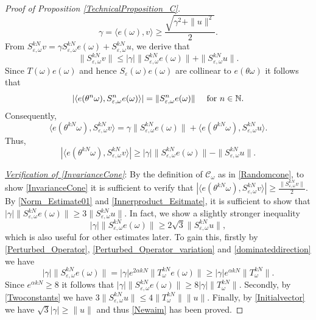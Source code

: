 \documentclass[pdflatex,sn-mathphys-num]{sn-jnl}%
\theoremstyle{thmstyleone}%
\theoremstyle{thmstyletwo}%
\theoremstyle{thmstylethree}%
\newcommand{\N}{\mathbb{N}}
\newcommand{\cC}{\mathcal{C}}
\newcommand{\eps}{\varepsilon}
\numberwithin{equation}{section}
\begin{document}
\begin{proof}[Proof of Proposition \ref{TechnicalProposition_C}]
\begin{equation}\label{Initialvector}
\gamma= \langle e(\omega),v\rangle \geq 
\frac{\sqrt{\gamma^2+\|u\|^2}}{2}.
\end{equation}
From $S_{\eps,\omega}^{kN} v= \gamma S_{\eps,\omega}^{kN} e(\omega)+ S_{\eps,\omega}^{kN} u$, we derive that 
\begin{equation}\label{Norm_Estimate01}
\|S_{\eps,\omega}^{kN} v\|
\leq |\gamma|\|S_{\eps,\omega}^{kN} e(\omega)\|+\|S_{\eps,\omega}^{kN}u\|.
\end{equation}
Since $T(\omega)e(\omega)$ and hence $S_{\eps}(\omega)e(\omega)$ are collinear to $e(\theta\omega)$ it follows that 
\[
|\langle e(\theta^n\omega), S_{\eps,\omega}^n e(\omega)\rangle|=\|S_{\eps,\omega}^ne(\omega)\|
\quad \hbox{ for } n\in\N.
\] 
Consequently,  
\[
\langle e(\theta^{kN}\omega),S_{\eps,\omega}^{kN} v\rangle
=
\gamma \|S_{\eps,\omega}^{kN}e(\omega)\|
+ 
\langle e(\theta^{kN}\omega),S_{\eps,\omega}^{kN} u\rangle.
\]
Thus,
\begin{equation}\label{Innerproduct_Esitmate}
\left|\langle e(\theta^{kN}\omega),S_{\eps,\omega}^{kN} v\rangle \right|
\geq |\gamma| \|S_{\eps,\omega}^{kN}e(\omega)\| -\|S_{\eps,\omega}^{kN} u\|.
\end{equation}

\noindent
\underline{\emph{Verification of \eqref{InvarianceCone}}}: By the  definition of $\cC_{\omega}$ as in \eqref{Randomcone}, to show \eqref{InvarianceCone} it is sufficient to
verify that  $\left|\langle e(\theta^{kN}\omega),S_{\eps,\omega}^{kN} v\rangle \right|\geq \frac{\|S_{\eps,\omega}^{kN} v\|}{2}$. By \eqref{Norm_Estimate01} and \eqref{Innerproduct_Esitmate}, it is sufficient to show that $|\gamma| \|S_{\eps,\omega}^{kN}e(\omega)\|
  \geq 
 3 \|S_{\eps,\omega}^{kN} u\|$. In fact, we show a slightly stronger inequality
\begin{equation}\label{Newaim}
  |\gamma| \|S_{\eps,\omega}^{kN}e(\omega)\|
  \geq 
 2\sqrt{3} \|S_{\eps,\omega}^{kN} u\|,
\end{equation}
which is also useful for other estimates later. To gain this, firstly by \eqref{Perturbed_Operator}, \eqref{Perturbed_Operator_variation} and  \eqref{dominateddirection} we have 
\[
|\gamma|\|S_{\eps,\omega}^{kN}e(\omega)\|= |\gamma|e^{2\alpha kN } \|T_{\omega}^{kN}e(\omega)\|
\geq |\gamma|e^{\alpha kN} \|T_{\omega}^{kN}\|.
\]
Since $e^{\alpha kN}\geq 8$ it follows that $|\gamma|\|S_{\eps,\omega}^{kN}e(\omega)\|\geq 8|\gamma| \|T_{\omega}^{kN}\|$. Secondly, by \eqref{Twoconstants} we have $3\|S_{\eps, \omega}^{kN}u\|\leq 4\|T_{\omega}^{kN}\|\|u\|$. Finally, by \eqref{Initialvector} we have $\sqrt{3}|\gamma|\geq \|u\|$ and thus \eqref{Newaim} has been proved.


\end{proof}
\end{document}
